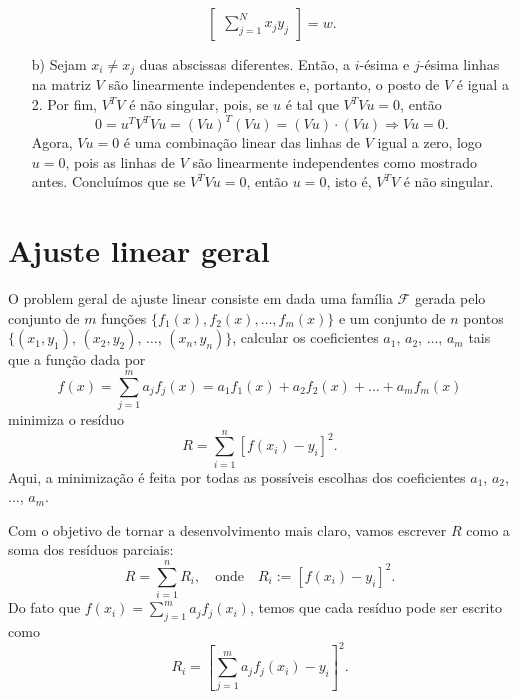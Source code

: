 \begin{resp}
\begin{itemize}
\begin{equation*}
\begin{bmatrix}
          \sum_{j=1}^N x_j y_j 
        \end{bmatrix} = w.
      \end{equation*}
    \item[b)] Sejam $x_i\neq x_j$ duas abscissas diferentes. Então, a $i$-ésima e $j$-ésima linhas na matriz $V$ são linearmente independentes e, portanto, o posto de $V$ é igual a 2. Por fim, $V^TV$ é não singular, pois, se $u$ é tal que $V^TVu = 0$, então
      \begin{equation*}
        0 = u^TV^TVu = (Vu)^T(Vu) = (Vu)\cdot (Vu) \Rightarrow Vu = 0.
      \end{equation*}
Agora, $Vu = 0$ é uma combinação linear das linhas de $V$ igual a zero, logo $u = 0$, pois as linhas de $V$ são linearmente independentes como mostrado antes. Concluímos que se $V^TVu = 0$, então $u = 0$, isto é, $V^TV$ é não singular.
    \end{itemize}
  
\end{resp}


\section{Ajuste linear geral}

O problem geral de ajuste linear consiste em dada uma família $\mathcal{F}$ gerada pelo conjunto de $m$ funções $\{f_1(x), f_2(x), \dotsc, f_m(x)\}$ e um conjunto de $n$ pontos $\{(x_1, y_1)$, $(x_2, y_2)$, $\ldots$, $(x_n, y_n)\}$, calcular os coeficientes $a_1$, $a_2$, $\ldots$, $a_m$ tais que a função dada por
\begin{equation*}
  f(x) = \sum_{j=1}^m a_jf_j(x) = a_1f_1(x)+a_2f_2(x)+\ldots+a_mf_m(x)
\end{equation*}
minimiza o resíduo
\begin{equation*}
  R= \sum_{i=1}^n \left[f(x_i)-y_i\right]^2.
\end{equation*}
Aqui, a minimização é feita por todas as possíveis escolhas dos coeficientes $a_1$, $a_2$, $\ldots$, $a_m$.

Com o objetivo de tornar a desenvolvimento mais claro, vamos escrever $R$ como a soma dos resíduos parciais:
\begin{equation*}
  R= \sum_{i=1}^n R_i,\quad \text{onde} \quad R_i := \left[f(x_i)-y_i\right]^2.
\end{equation*}
Do fato que $f(x_i)=\sum_{j=1}^m a_jf_j(x_i)$, temos que cada resíduo pode ser escrito como
\begin{equation*}
  R_i=  \left[\sum_{j=1}^m a_jf_j(x_i)-y_i\right]^2.
\end{equation*}


